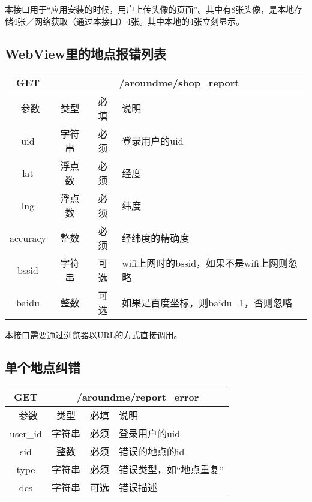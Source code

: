 \documentclass[cs4size]{ctexartutf8}
\begin{document}
本接口用于“应用安装的时候，用户上传头像的页面”。其中有8张头像，是本地存储4张／网络获取（通过本接口）4张。其中本地的4张立刻显示。


\subsection{WebView里的地点报错列表}

\begin{table}[H]
   \begin{center}
\begin{tabular}{|c|c|c|p{12cm}|}
\hline
GET & \multicolumn{3}{|c|}{/aroundme/shop\_report} \\
\hline\hline
 \  参数  & 类型 & 必填 &  说明  \\
 \hline
 uid  & 字符串 & 必须 & 登录用户的uid\\
\hline
 lat  & 浮点数 & 必须 & 经度\\
\hline
 lng  &  浮点数 & 必须 & 纬度\\ 
\hline
 accuracy  & 整数 & 必须 & 经纬度的精确度\\ 
\hline
 bssid  & 字符串 & 可选 & wifi上网时的bssid，如果不是wifi上网则忽略\\  
\hline
 baidu  & 整数 & 可选 & 如果是百度坐标，则baidu=1，否则忽略\\  
\hline
\end{tabular}
   \end{center}
\end{table}

本接口需要通过浏览器以URL的方式直接调用。



\subsection{单个地点纠错}

\begin{table}[H]
   \begin{center}
\begin{tabular}{|c|c|c|p{12cm}|}
\hline
GET & \multicolumn{3}{|c|}{/aroundme/report\_error} \\
\hline\hline
 \  参数  & 类型 & 必填 &  说明  \\
 \hline
 user\_id  & 字符串 & 必须 & 登录用户的uid\\
\hline
 sid  & 整数 & 必须 & 错误的地点的id\\
\hline
 type  & 字符串 & 必须 & 错误类型，如“地点重复”\\ 
\hline
 des  & 字符串 & 可选 & 错误描述\\  
\hline
\end{tabular}
   \end{center}
\end{table}
\end{document}
